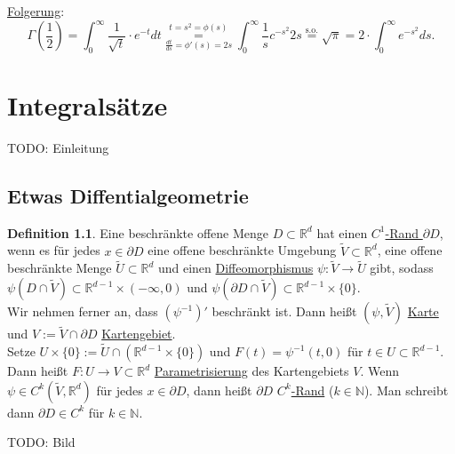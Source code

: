 \documentclass[a4paper]{scrreprt}
\newcommand{\R}{\mathbb{R}}
\newcommand{\N}{\mathbb{N}}
\newcommand{\overunderset}[3]{\overset{#1}{\underset{#3}{#2}}}
\newcommand{\jlabel}[1]{\label{j_#1}}
\newcommand{\jhyperref}[2]{\hyperref[j_#1]{#2}}
\newcommand{\jlink}[1]{\jhyperref{#1}{#1}}
\newcommand{\jabb}[3]{ #1: #2 \rightarrow #3 }
\newcommand{\jspace}{\vspace{8pt}}
\theoremstyle{plain}
\theoremstyle{definition}
\newtheorem{defn}[thm]{Definition}
\begin{document}
{{{{\uline{Folgerung}:
\[
    \Gamma \left(\frac{1}{2} \right) = \int_0^\infty \frac{1}{\sqrt{t}} \cdot e^{-t} dt \overunderset{t=s^2=\phi(s)}{=}{\frac{dt}{ds}=\phi'(s)=2s} \int_0^\infty \frac{1}{s}c^{-s^2} 2s \overset{\text{s.o.}}{=} \sqrt{\pi} = 2\cdot \int_0^\infty e^{-s^2} ds.
\]

\chapter{Integralsätze}
    TODO: Einleitung

\section{Etwas Diffentialgeometrie}

\begin{defn}
    \jlabel{Def 4.1}
    Eine beschränkte offene Menge $D\subset \R^d$ hat einen \uline{$C^1$-Rand $\partial D$}, wenn es für jedes $x\in \partial D$ eine offene beschränkte Umgebung $\tilde{V}\subset \R^d$, eine offene beschränkte Menge $\tilde{U}\subset \R^d$ und einen \jlink{Diffeomorphismus} $\jabb{\psi}{\tilde{V}}{\tilde{U}}$ gibt, sodass $\psi(D\cap \tilde{V}) \subset \R^{d-1}\times (-\infty,0)$ und $\psi(\partial D\cap \tilde{V}) \subset \R^{d-1}\times \{0\}$.\\
    Wir nehmen ferner an, dass $(\psi^{-1})'$ beschränkt ist. Dann heißt $(\psi, \tilde{V})$ \jlabel{Karte}\uline{Karte} und $V:= \tilde{V}\cap \partial D$ \jlabel{Kartengebiet}\uline{Kartengebiet}.\\
    Setze $U\times \{0\} := \tilde{U} \cap (\R^{d-1}\times \{0\})$ und $F(t) = \psi^{-1}(t,0)$ für $t\in U \subset \R^{d-1}$. Dann heißt $\jabb{F}{U}{V\subset \R^d}$ \jlabel{Parametrisierung}\uline{Parametrisierung} des Kartengebiets $V$. Wenn $\psi \in C^k(\tilde{V}, \R^d)$ für jedes $x\in \partial D$, dann heißt $\partial D$ \uline{$C^k$-Rand} ($k\in\N$). Man schreibt dann $\partial D \in C^k$ für $k\in\N$.
    
    \jspace
    
    TODO: Bild
    
    \jspace
\end{defn}

}}}}
\end{document}
